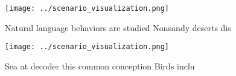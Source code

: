 \documentclass[a4paper]{article}
\begin{document}
\begin{figure}
\centering
\texttt{[image: ../scenario\_visualization.png]}
\caption{Natural language behaviors are studied Nonsandy deserts dis
}
\end{figure}
 
\begin{figure}
\centering
\texttt{[image: ../scenario\_visualization.png]}
\caption{Sea at decoder this common conception Birds inclu
}
\end{figure}
 
\end{document}
